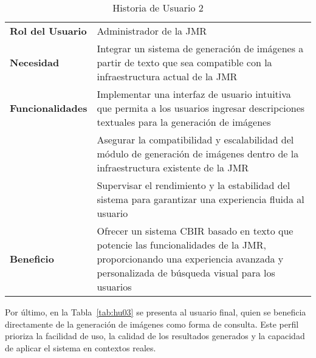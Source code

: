 \begin{table}[ht]
    \centering
    \renewcommand{\arraystretch}{1.5}
    \begin{tabular}{|>{\columncolor{gray!10}}p{4cm}|p{10cm}|}
        \hline
        \rowcolor{gray!30}
        \multicolumn{2}{|c|}{\textbf{Historia de Usuario 2}} \\
        \hline
        \textbf{Rol del Usuario} & Administrador de la JMR \\
        \hline
        \textbf{Necesidad} & Integrar un sistema de generación de imágenes a partir de texto que sea compatible con la infraestructura actual de la JMR \\
        \hline
        \textbf{Funcionalidades} & Implementar una interfaz de usuario intuitiva que permita a los usuarios ingresar descripciones textuales para la generación de imágenes
        \\ & Asegurar la compatibilidad y escalabilidad del módulo de generación de imágenes dentro de la infraestructura existente de la JMR
        \\ & Supervisar el rendimiento y la estabilidad del sistema para garantizar una experiencia fluida al usuario \\
        \hline
        \textbf{Beneficio} & Ofrecer un sistema CBIR basado en texto que potencie las funcionalidades de la JMR, proporcionando una experiencia avanzada y personalizada de búsqueda visual para los usuarios \\
        \hline
    \end{tabular}
    \caption{Historia de Usuario 2}
    \label{tab:hu02}
\end{table}

Por último, en la Tabla~\ref{tab:hu03} se presenta al usuario final, quien se beneficia directamente de la generación de imágenes como forma de consulta. Este perfil prioriza la facilidad de uso, la calidad de los resultados generados y la capacidad de aplicar el sistema en contextos reales.

